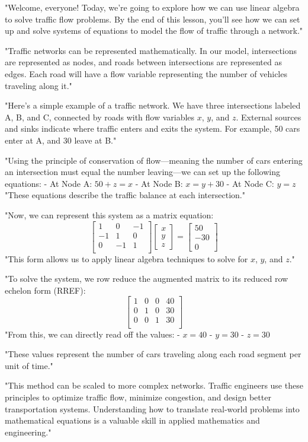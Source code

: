 "Welcome, everyone! Today, we’re going to explore how we can use linear algebra to solve traffic flow problems. By the end of this lesson, you’ll see how we can set up and solve systems of equations to model the flow of traffic through a network."

"Traffic networks can be represented mathematically. In our model, intersections are represented as nodes, and roads between intersections are represented as edges. Each road will have a flow variable representing the number of vehicles traveling along it."

"Here’s a simple example of a traffic network. We have three intersections labeled A, B, and C, connected by roads with flow variables \( x \), \( y \), and \( z \). External sources and sinks indicate where traffic enters and exits the system. For example, 50 cars enter at A, and 30 leave at B."

"Using the principle of conservation of flow—meaning the number of cars entering an intersection must equal the number leaving—we can set up the following equations:
- At Node A: \( 50 + z = x \)
- At Node B: \( x = y + 30 \)
- At Node C: \( y = z \) 
"These equations describe the traffic balance at each intersection."

"Now, we can represent this system as a matrix equation:
\[
\begin{bmatrix}
1 & 0 & -1 \\
-1 & 1 & 0 \\
0 & -1 & 1 \\
\end{bmatrix}
\begin{bmatrix}
x \\ y \\ z
\end{bmatrix}
=
\begin{bmatrix}
50 \\ -30 \\ 0
\end{bmatrix}
\]
"This form allows us to apply linear algebra techniques to solve for \( x \), \( y \), and \( z \)."

"To solve the system, we row reduce the augmented matrix to its reduced row echelon form (RREF):
\[
\begin{bmatrix}
1 & 0 & 0 & 40 \\
0 & 1 & 0 & 30 \\
0 & 0 & 1 & 30 \\
\end{bmatrix}
\]
"From this, we can directly read off the values:
- \( x = 40 \)
- \( y = 30 \)
- \( z = 30 \)

"These values represent the number of cars traveling along each road segment per unit of time."

"This method can be scaled to more complex networks. Traffic engineers use these principles to optimize traffic flow, minimize congestion, and design better transportation systems. Understanding how to translate real-world problems into mathematical equations is a valuable skill in applied mathematics and engineering."
